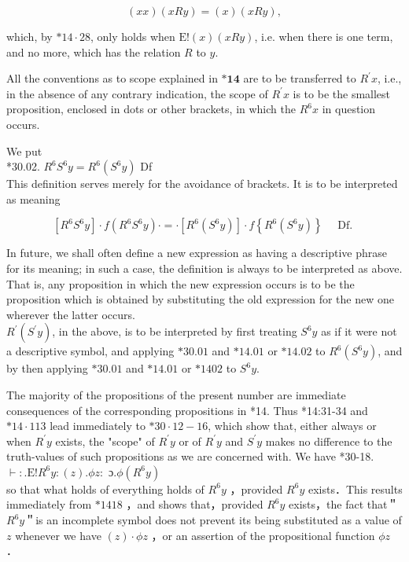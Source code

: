 \documentclass[10pt]{article}
\begin{document}
$$
(x x)(x R y)=(x)(x R y),
$$

which, by $* 14 \cdot 28$, only holds when $\mathrm{E}!(x)(x R y)$, i.e. when there is one term, and no more, which has the relation $R$ to $y$.

All the conventions as to scope explained in $\boldsymbol{*} \mathbf{1 4}$ are to be transferred to $R^{\prime} x$, i.e., in the absence of any contrary indication, the scope of $R^{\prime} x$ is to be the smallest proposition, enclosed in dots or other brackets, in which the $R^{6} x$ in question occurs.

We put\\
*30.02. $R^{6} S^{6} y=R^{6}\left(S^{6} y\right)$ Df\\
This definition serves merely for the avoidance of brackets. It is to be interpreted as meaning

$$
\left[R^{6} S^{6} y\right] \cdot f\left(R^{6} S^{6} y\right) \cdot=\cdot\left[R^{6}\left(S^{6} y\right)\right] \cdot f\left\{R^{6}\left(S^{6} y\right)\right\} \quad \text { Df. }
$$

In future, we shall often define a new expression as having a descriptive phrase for its meaning; in such a case, the definition is always to be interpreted as above. That is, any proposition in which the new expression occurs is to be the proposition which is obtained by substituting the old expression for the new one wherever the latter occurs.\\
$R^{\prime}\left(S^{\prime} y\right)$, in the above, is to be interpreted by first treating $S^{6} y$ as if it were not a descriptive symbol, and applying $* 30.01$ and $* 14.01$ or $* 14.02$ to $R^{6}\left(S^{6} y\right)$, and by then applying $* 30.01$ and $* 14.01$ or $* 1402$ to $S^{6} y$.

The majority of the propositions of the present number are immediate consequences of the corresponding propositions in *14. Thus *14:31-34 and $* 14 \cdot 113$ lead immediately to $* 30 \cdot 12-16$, which show that, either always or when $R^{\prime} y$ exists, the "scope" of $R^{\prime} y$ or of $R^{\prime} y$ and $S^{\prime} y$ makes no difference to the truth-values of such propositions as we are concerned with. We have *30-18. $\vdash: . \mathrm{E}!R^{6} y:(z) . \phi z:$ ɔ.$\phi\left(R^{6} y\right)$\\
so that what holds of everything holds of $R^{6} y$ ，provided $R^{6} y$ exists．This results immediately from $* 1418$ ，and shows that，provided $R^{6} y$ exists，the fact that＂$R^{6} y$＂is an incomplete symbol does not prevent its being substituted as a value of $z$ whenever we have $(z) \cdot \phi z$ ，or an assertion of the propositional function $\phi z$ ．
\end{document}
